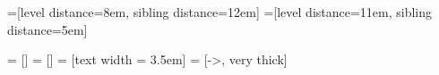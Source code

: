 \begin{frame}
\begin{adjustwidth}{-2.5em}{-2.5em}

=[level distance=8em, sibling distance=12em]
=[level distance=11em, sibling distance=5em]

 = []
 = []
 = [text width = 3.5em]
 = [->, very thick]



\end{adjustwidth}
\end{frame}
